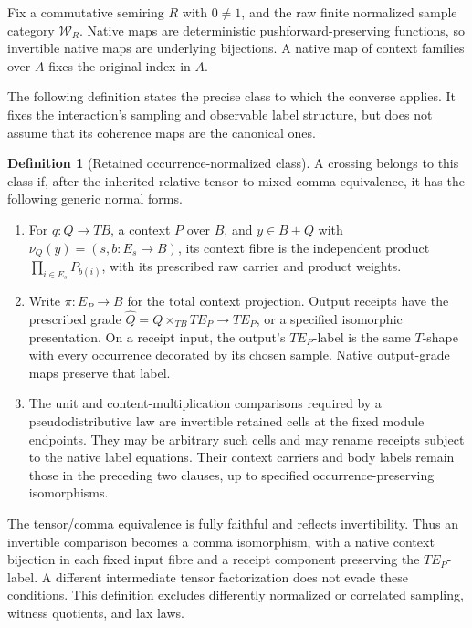 \documentclass[11pt,a4paper]{article}
\theoremstyle{definition}
\newtheorem{definition}[theorem]{Definition}
\newcommand{\W}{\mathcal W_R}
\begin{document}
Fix a commutative semiring $R$ with $0\ne1$, and the raw finite normalized
sample category $\W$. Native maps are deterministic pushforward-preserving
functions, so invertible native maps are underlying bijections. A native
map of context families over $A$ fixes the original index in $A$.

The following definition states the precise class to which the converse
applies. It fixes the interaction's sampling and observable label structure,
but does not assume that its coherence maps are the canonical ones.

\begin{definition}[Retained occurrence-normalized class]\label{rb:normalform}
A crossing belongs to this class if, after the inherited relative-tensor
to mixed-comma equivalence, it has the following generic normal forms.
\begin{enumerate}
\item For $q:Q\to TB$, a context $P$ over $B$, and
$y\in B+Q$ with $\nu_Q(y)=(s,b:E_s\to B)$, its context fibre is the
independent product $\prod_{i\in E_s}P_{b(i)}$, with its prescribed raw
carrier and product weights.
\item Write $\pi:E_P\to B$ for the total context projection. Output
receipts have the prescribed grade
$\widehat Q=Q\times_{TB}TE_P\to TE_P$, or a specified isomorphic
presentation. On a receipt input, the output's $TE_P$-label is the same
$T$-shape with every occurrence decorated by its chosen sample. Native
output-grade maps preserve that label.
\item The unit and content-multiplication comparisons required by a
pseudodistributive law are invertible retained cells at the fixed module
endpoints. They may be arbitrary such cells and may rename receipts
subject to the native label equations. Their context carriers and body
labels remain those in the preceding two clauses, up to specified
occurrence-preserving isomorphisms.
\end{enumerate}
\end{definition}

The tensor/comma equivalence is fully faithful and reflects invertibility.
Thus an invertible comparison becomes a comma isomorphism, with a native
context bijection in each fixed input fibre and a receipt component
preserving the $TE_P$-label. A different intermediate tensor factorization
does not evade these conditions. This definition excludes differently
normalized or correlated sampling, witness quotients, and lax laws.
\end{document}
